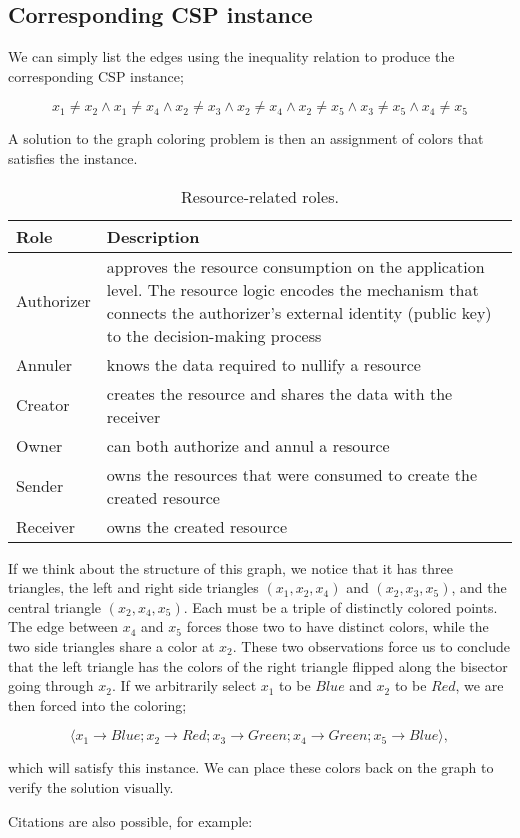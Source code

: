 \subsection{Corresponding CSP instance}

We can simply list the edges using the inequality relation to produce the corresponding CSP instance;

\begin{equation}
    x_1 \neq x_2 \wedge x_1 \neq x_4 \wedge x_2 \neq x_3 \wedge x_2 \neq x_4 \wedge x_2 \neq x_5 \wedge x_3 \neq x_5 \wedge x_4 \neq x_5
\end{equation}

A solution to the graph coloring problem is then an assignment of colors that satisfies the instance. 


\begin{table*}[!h]
\begin{center}
\begin{tabular}{|p{1.5cm}|p{13cm}|}
\hline
 \textbf{Role} & \textbf{Description} \\ \hline
 Authorizer & approves the resource consumption on the application level. The resource logic encodes the mechanism that connects the authorizer's external identity (public key) to the decision-making process \\ \hline
 Annuler & knows the data required to nullify a resource
 \\ \hline
Creator & creates the resource and shares the data with the receiver
\\ \hline
Owner & can both authorize and annul a resource
\\ \hline
Sender & owns the resources that were consumed to create the created resource
\\ \hline
Receiver & owns the created resource
\\ \hline
\end{tabular}
\caption{Resource-related roles.}
\end{center}
\end{table*}


If we think about the structure of this graph, we notice that it has three triangles, the left and right side triangles $(x_1, x_2, x_4)$  and $(x_2, x_3, x_5)$, and the central triangle $(x_2, x_4, x_5)$. Each must be a triple of distinctly colored points. The edge between $x_4$ and $x_5$ forces those two to have distinct colors, while the two side triangles share a color at $x_2$. These two observations force us to conclude that the left triangle has the colors of the right triangle flipped along the bisector going through $x_2$. If we arbitrarily select $x_1$ to be $\mathit{Blue}$ and $x_2$ to be $\mathit{Red}$, we are then forced into the coloring;

\begin{equation}
 \langle x_1 \rightarrow \mathit{Blue}; x_2 \rightarrow \mathit{Red}; x_3 \rightarrow \mathit{Green}; x_4 \rightarrow \mathit{Green}; x_5 \rightarrow \mathit{Blue}\rangle,
\end{equation}

which will satisfy this instance. We can place these colors back on the graph to verify the solution visually.

Citations are also possible, for example: \citep{christopher_goes_2023_8279842}
